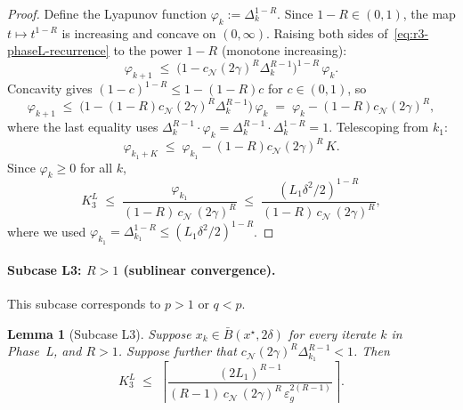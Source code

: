 \documentclass[11pt,a4paper]{article}
\theoremstyle{plain}
\newtheorem{lemma}{Lemma}
\theoremstyle{definition}
\newcommand{\eps}{\varepsilon}
\newcommand{\epsg}{\eps_{g}}
\newcommand{\xstar}{x^{\star}}
\newcommand{\Lone}{L_{1}}
\newcommand{\setN}{\mathcal{N}}
\newcommand{\cN}{c_{\setN}}
\begin{document}
\begin{proof}
Define the Lyapunov function $\varphi_{k} := \Delta_{k}^{1-R}$. Since $1-R \in (0,1)$, the map $t \mapsto t^{1-R}$ is increasing and concave on $(0,\infty)$. Raising both sides of~\eqref{eq:r3-phaseL-recurrence} to the power $1-R$ (monotone increasing):
\[
\varphi_{k+1} \;\leq\; \bigl(1 - \cN(2\gamma)^{R}\Delta_{k}^{R-1}\bigr)^{1-R}\,\varphi_{k}.
\]
Concavity gives $(1-c)^{1-R} \leq 1 - (1-R)c$ for $c \in (0,1)$, so
\[
\varphi_{k+1} \;\leq\; \bigl(1 - (1-R)\cN(2\gamma)^{R}\Delta_{k}^{R-1}\bigr)\,\varphi_{k} \;=\; \varphi_{k} - (1-R)\cN(2\gamma)^{R},
\]
where the last equality uses $\Delta_{k}^{R-1}\cdot\varphi_{k} = \Delta_{k}^{R-1}\cdot\Delta_{k}^{1-R} = 1$. Telescoping from $k_{1}$:
\[
\varphi_{k_{1}+K} \;\leq\; \varphi_{k_{1}} - (1-R)\cN(2\gamma)^{R}\,K.
\]
Since $\varphi_{k} \geq 0$ for all $k$,
\[
K_{3}^{L} \;\leq\; \frac{\varphi_{k_{1}}}{(1-R)\,\cN\,(2\gamma)^{R}} \;\leq\; \frac{(\Lone\delta^{2}/2)^{1-R}}{(1-R)\,\cN\,(2\gamma)^{R}},
\]
where we used $\varphi_{k_{1}} = \Delta_{k_{1}}^{1-R} \leq (\Lone\delta^{2}/2)^{1-R}$.
\end{proof}

\paragraph{Subcase L3: $R > 1$ (sublinear convergence).}

This subcase corresponds to $p > 1$ or $q < p$.

\begin{lemma}[Subcase L3]\label{lem:r3-L3}
Suppose $x_{k} \in \bar B(\xstar, 2\delta)$ for every iterate $k$ in Phase~L, and $R > 1$. Suppose further that $\cN(2\gamma)^{R}\Delta_{k_{1}}^{R-1} < 1$. Then
\begin{equation}\label{eq:r3-L3-bound}
K_{3}^{L} \;\leq\; \left\lceil \frac{(2\Lone)^{R-1}}{(R-1)\,\cN\,(2\gamma)^{R}\,\epsg^{2(R-1)}} \right\rceil.
\end{equation}
\end{lemma}
\end{document}
